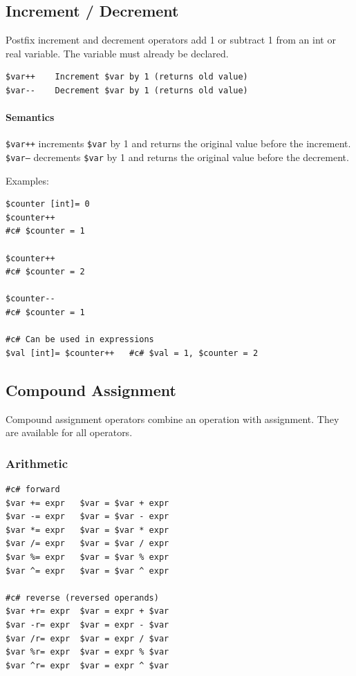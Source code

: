 \subsection{Increment / Decrement}
Postfix increment and decrement operators add 1 or subtract 1 from an int or real variable. The variable must already be declared.
\begin{verbatim}
$var++    Increment $var by 1 (returns old value)
$var--    Decrement $var by 1 (returns old value)
\end{verbatim}

\paragraph{Semantics}
\texttt{\$var++} increments \texttt{\$var} by 1 and returns the original value before the increment.
\texttt{\$var--} decrements \texttt{\$var} by 1 and returns the original value before the decrement.

Examples:
\begin{verbatim}
$counter [int]= 0
$counter++
#c# $counter = 1

$counter++
#c# $counter = 2

$counter--
#c# $counter = 1

#c# Can be used in expressions
$val [int]= $counter++   #c# $val = 1, $counter = 2
\end{verbatim}

\subsection{Compound Assignment}
Compound assignment operators combine an operation with assignment. They are available for all operators.

\subsubsection{Arithmetic}
\begin{verbatim}
#c# forward
$var += expr   $var = $var + expr
$var -= expr   $var = $var - expr
$var *= expr   $var = $var * expr
$var /= expr   $var = $var / expr
$var %= expr   $var = $var % expr
$var ^= expr   $var = $var ^ expr

#c# reverse (reversed operands)
$var +r= expr  $var = expr + $var
$var -r= expr  $var = expr - $var
$var /r= expr  $var = expr / $var
$var %r= expr  $var = expr % $var
$var ^r= expr  $var = expr ^ $var
\end{verbatim}

